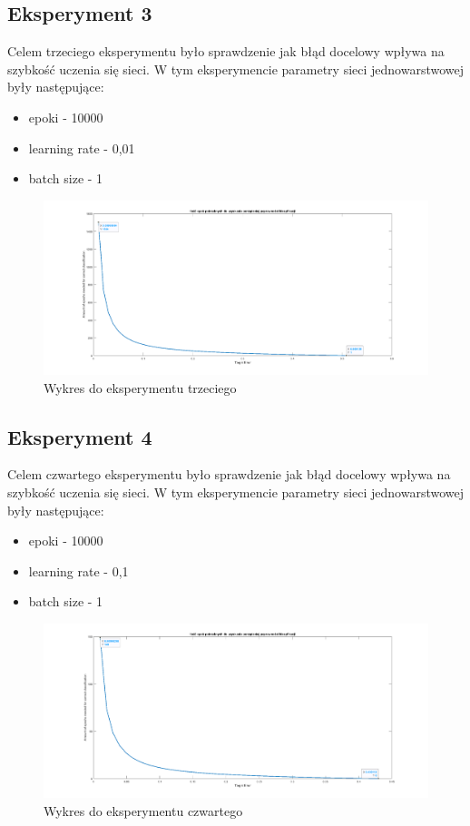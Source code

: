 \documentclass[12pt,twoside]{article}
\begin{document}
\subsection{Eksperyment 3}
Celem trzeciego eksperymentu było sprawdzenie jak błąd docelowy wpływa na szybkość uczenia się sieci.
W tym eksperymencie parametry sieci jednowarstwowej były następujące:
\begin{itemize}
	\item epoki - 10000
	\item learning rate - 0,01
	\item batch size - 1
\end{itemize}

\begin{figure}[ht!]
	\centering
	\includegraphics[width=15cm]{figures/target_epo_eta=0_01.png}
	\caption{Wykres do eksperymentu trzeciego}
\end{figure}
\newpage

\subsection{Eksperyment 4}
Celem czwartego eksperymentu było sprawdzenie jak błąd docelowy wpływa na szybkość uczenia się sieci.
W tym eksperymencie parametry sieci jednowarstwowej były następujące:
\begin{itemize}
	\item epoki - 10000
	\item learning rate - 0,1
	\item batch size - 1
\end{itemize}

\begin{figure}[ht!]
	\centering
	\includegraphics[width=15cm]{figures/target_epo_eta=0_1.png}
	\caption{Wykres do eksperymentu czwartego}
\end{figure}
\newpage
\end{document}
